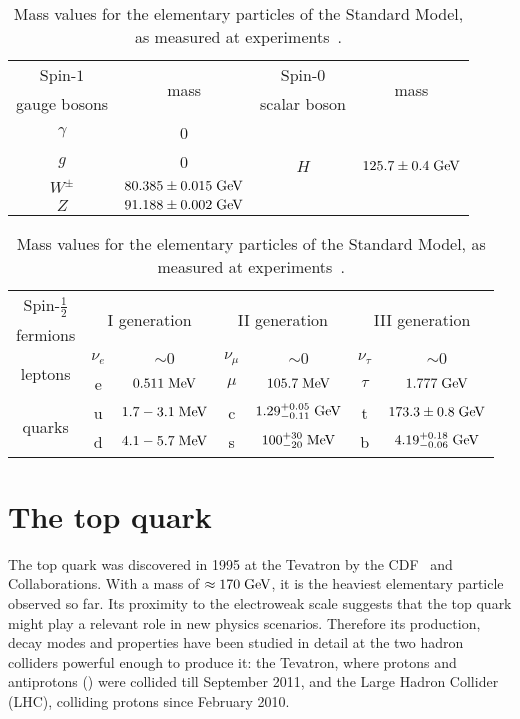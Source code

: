 \begin{table}\centering
  \begin{tabular}{cccc}\toprule
    Spin-$1$ & \multirow{2}{*}{mass} & Spin-0 & \multirow{2}{*}{mass}\\
    gauge bosons & & scalar boson & \\\midrule
    $\gamma$      & 0  & \multirow{4}{*}{$H$} & \multirow{4}{*}{$125.7\pm0.4\; \mathrm{GeV}$}\\
    $g$           & 0  & &                        \\
    $W^{\pm}$ & $ 80.385 \pm 0.015 \; \mathrm{GeV}$ & &\\
    $Z$       & $ 91.188 \pm 0.002 \; \mathrm{GeV}$ & &\\\bottomrule
  \end{tabular}
  \begin{tabular}{ccccccc}\toprule
    Spin-$\tfrac{1}{2}$ &  \multicolumn{2}{c}{\multirow{2}{*}{I generation}}
    &  \multicolumn{2}{c}{\multirow{2}{*}{II generation}}
    &  \multicolumn{2}{c}{\multirow{2}{*}{III generation}}\\
    fermions & & & & & \\\midrule
    \multirow{2}{*}{leptons} &
    $\nu_{e}$   & \small{$\sim 0$} &  
    $\nu_{\mu}$ & \small{$\sim 0$} &  
    $\nu_{\tau}$ & \small{$\sim 0$} \\
    &
    e            & \small{$0.511\; \mathrm{MeV}$}   &  
    $\mu$ & \small{$105.7\; \mathrm{MeV}$} &  
    $\tau$     & \small{$1.777\; \mathrm{GeV}$} \\
    \multirow{2}{*}{quarks} &
    u & \small{$1.7-3.1\; \mathrm{MeV}$}         &  
    c & \small{$1.29^{+0.05}_{-0.11}\; \mathrm{GeV}$}  &  
    t & \small{$173.3\pm0.8\; \mathrm{GeV}$}\\
    &
    d & \small{$4.1-5.7\; \mathrm{MeV}$} &  
    s & \small{$100^{+30}_{-20}\; \mathrm{MeV}$} &  
    b & \small{$4.19^{+0.18}_{-0.06}\; \mathrm{GeV}$} \\
\bottomrule
  \end{tabular}
  \caption{Mass values for the elementary particles of the Standard
    Model, as measured at experiments~\cite{Agashe:2014kda}.}
\label{tab:smmasses}
\end{table}
 
\section{The top quark}
\label{sec:topquark}

The top quark was discovered in 1995 at the Tevatron by the
CDF~\cite{topcdf} and \dzero{}~\cite{topdzero} Collaborations. With a
mass of $\approx{}170\; \mathrm{GeV}{}$, it is the heaviest elementary particle
observed so far. Its proximity to the electroweak scale suggests that
the top quark might play a relevant role in new physics
scenarios. Therefore its production, decay modes and properties have
been studied in detail at the two hadron colliders powerful 
enough to produce it: the Tevatron, where protons and antiprotons (\ppbar{}) were
collided till September 2011, and the Large Hadron Collider (LHC),
colliding protons since February 2010.

